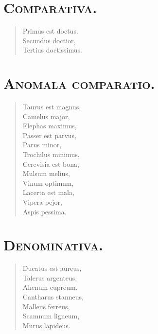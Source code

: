 \section*{\textsc{Comparativa.}}


\begin{verse}

  Primus est doctus.\\
  Secundus doctior,\\
  Tertius doctissimus.\\
\end{verse}



\section*{\textsc{Anomala comparatio.}}


\begin{verse}

  Taurus est magnus,\\
  Camelus major,\\
  Elephas maximus,\\
  Passer est parvus,\\
  Parus minor,\\
  Trochilus minimus,\\
  Cerevisia est bona,\\
  Mulsum melius,\\
  Vinum optimum,\\
  Lacerta est mala,\\
  Vipera pejor,\\
  Aspis pessima.\\
\end{verse}



\section*{\textsc{Denominativa.}}


\begin{verse}

  Ducatus est aureus,\\
  Talerus argenteus,\\
  Ahenum cupreum,\\
  Cantharus stanneus,\\
  Malleus ferreus,\\
  Scamnum ligneum,\\
  Murus lapideus.\\
\end{verse}



